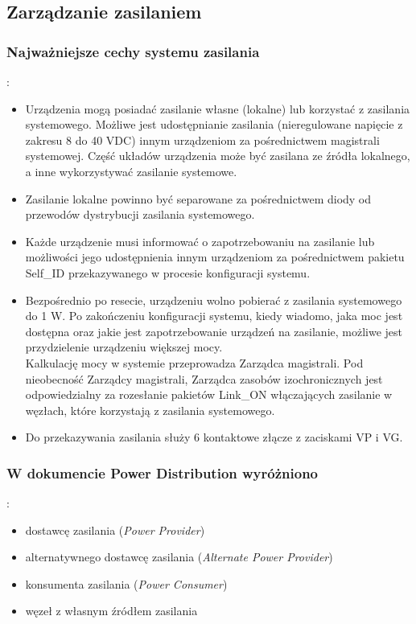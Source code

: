 \subsection{Zarządzanie zasilaniem}
\subsubsection{Najważniejsze cechy systemu zasilania}:
\begin{itemize}
	\item Urządzenia mogą posiadać zasilanie własne (lokalne) lub korzystać z zasilania systemowego. Możliwe jest udostępnianie zasilania (nieregulowane napięcie z zakresu 8 do 40 VDC) innym urządzeniom za	pośrednictwem magistrali systemowej. Część układów urządzenia może być zasilana ze źródła lokalnego, a inne wykorzystywać zasilanie systemowe.
	\item Zasilanie lokalne powinno być separowane za pośrednictwem diody od przewodów dystrybucji zasilania systemowego.
	\item Każde urządzenie musi informować o zapotrzebowaniu na zasilanie lub możliwości jego udostępnienia innym urządzeniom za pośrednictwem pakietu Self\_ID przekazywanego w procesie konfiguracji systemu.
	\item Bezpośrednio po resecie, urządzeniu wolno pobierać z zasilania systemowego do 1 W. Po zakończeniu konfiguracji systemu, kiedy wiadomo, jaka moc jest dostępna oraz jakie jest zapotrzebowanie urządzeń na zasilanie, możliwe jest przydzielenie urządzeniu większej mocy.\\
	Kalkulację mocy w systemie przeprowadza Zarządca magistrali. Pod nieobecność Zarządcy magistrali, Zarządca zasobów izochronicznych jest odpowiedzialny za rozesłanie pakietów Link\_ON włączających zasilanie w węzłach, które korzystają z zasilania systemowego.
	\item Do przekazywania zasilania służy 6 kontaktowe złącze z zaciskami VP i VG.
\end{itemize}
\subsubsection{W dokumencie Power Distribution wyróżniono}:
\begin{itemize}
	\item dostawcę zasilania (\emph{Power Provider})
	\item alternatywnego dostawcę zasilania (\emph{Alternate Power Provider})
	\item konsumenta zasilania (\emph{Power Consumer})
	\item węzeł z własnym źródłem zasilania
\end{itemize}
